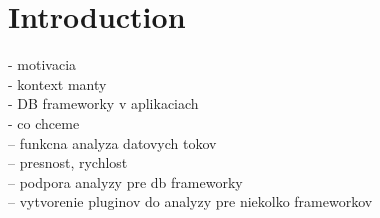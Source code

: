 
\chapter*{Introduction}

- motivacia \\
- kontext manty \\
- DB frameworky v aplikaciach \\

- co chceme \\
-- funkcna analyza datovych tokov \\
-- presnost, rychlost \\
-- podpora analyzy pre db frameworky \\
-- vytvorenie pluginov do analyzy pre niekolko frameworkov




